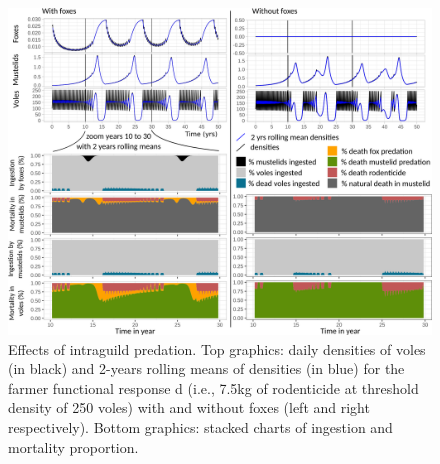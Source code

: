 \documentclass[11pt]{article}
\begin{document}
\begin{figure}
\begin{center}
\includegraphics[width=\linewidth]{img/IGP_Graph.png}
\caption{Effects of intraguild predation. Top graphics: daily densities of voles (in black) and 2-years rolling means of densities (in blue) for the farmer functional response d (i.e., 7.5kg of rodenticide at threshold density of 250 voles) with and without foxes (left and right respectively). Bottom graphics: stacked charts of ingestion and mortality proportion.}
\label{fig:intraguild}
\end{center}
\end{figure}
\end{document}

